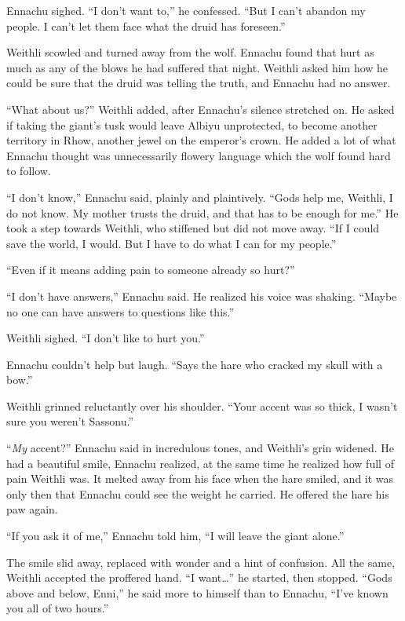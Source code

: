 Ennachu sighed. ``I don't want to,'' he confessed. ``But I can't abandon my people. I can't let them face what the druid has foreseen.''

Weithli scowled and turned away from the wolf. Ennachu found that hurt as much as any of the blows he had suffered that night. Weithli asked him how he could be sure that the druid was telling the truth, and Ennachu had no answer.

``What about us?'' Weithli added, after Ennachu's silence stretched on. He asked if taking the giant's tusk would leave Albiyu unprotected, to become another territory in Rhow, another jewel on the emperor's crown. He added a lot of what Ennachu thought was unnecessarily flowery language which the wolf found hard to follow.

``I don't know,'' Ennachu said, plainly and plaintively. ``Gods help me, Weithli, I do not know. My mother trusts the druid, and that has to be enough for me.'' He took a step towards Weithli, who stiffened but did not move away. ``If I could save the world, I would. But I have to do what I can for my people.''

``Even if it means adding pain to someone already so hurt?''

``I don't have answers,'' Ennachu said. He realized his voice was shaking. ``Maybe no one can have answers to questions like this.''

Weithli sighed. ``I don't like to hurt you.''

Ennachu couldn't help but laugh. ``Says the hare who cracked my skull with a bow.''

Weithli grinned reluctantly over his shoulder. ``Your accent was so thick, I wasn't sure you weren't Sassonu.''

``\emph{My} accent?'' Ennachu said in incredulous tones, and Weithli's grin widened. He had a beautiful smile, Ennachu realized, at the same time he realized how full of pain Weithli was. It melted away from his face when the hare smiled, and it was only then that Ennachu could see the weight he carried. He offered the hare his paw again.

``If you ask it of me,'' Ennachu told him, ``I will leave the giant alone.''

The smile slid away, replaced with wonder and a hint of confusion. All the same, Weithli accepted the proffered hand. ``I want\ldots'' he started, then stopped. ``Gods above and below, Enni,'' he said more to himself than to Ennachu, ``I've known you all of two hours.''

